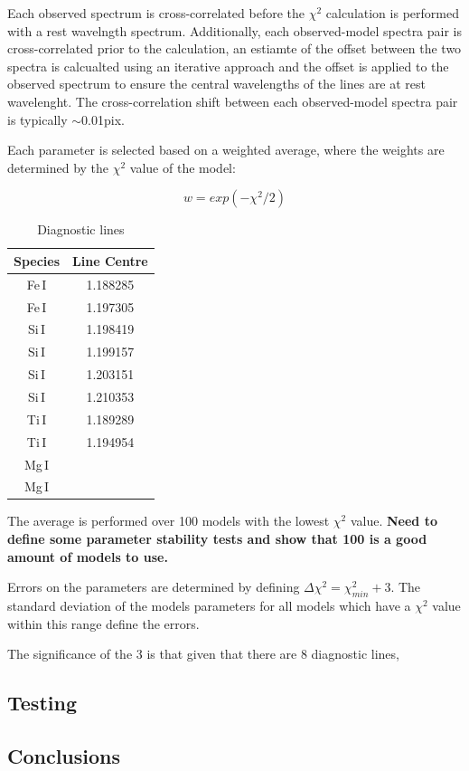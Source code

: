 \documentclass[12pt]{article}
\begin{document}
Each observed spectrum is cross-correlated before the $\chi^{2}$ calculation is performed with a rest wavelngth spectrum.
Additionally, each observed-model spectra pair is cross-correlated prior to the calculation, an estiamte of the offset between the two spectra is calcualted using an iterative approach and the offset is applied to the observed spectrum to ensure the central wavelengths of the lines are at rest wavelenght.
The cross-correlation shift between each observed-model spectra pair is typically $\sim$0.01pix.

Each parameter is selected based on a weighted average, where the weights are
determined by the $\chi^{2}$ value of the model:

\begin{equation}
    w = exp(-\chi^{2}/2)
\end{equation}

\begin{table}
\caption{Diagnostic lines\label{tb:lines}}
\scriptsize
\begin{center}
\begin{tabular}{cc}
 \hline
 \hline
Species & Line Centre \\
 \hline
Fe\,I & 1.188285 \\
Fe\,I & 1.197305 \\
Si\,I & 1.198419 \\
Si\,I & 1.199157 \\
Si\,I & 1.203151 \\
Si\,I & 1.210353 \\
Ti\,I & 1.189289 \\
Ti\,I & 1.194954 \\
Mg\,I & \\
Mg\,I & \\
 \hline
\end{tabular}
\end{center}
\end{table}

The average is performed over 100 models with the lowest $\chi^{2}$ value.
\textbf{Need to define some parameter stability tests and show that 100 is a
good amount of models to use.}

Errors on the parameters are determined by defining
$\Delta\chi^{2} = \chi^{2}_{min} + 3$.
The standard deviation of the models parameters for all models which have a
$\chi^{2}$ value within this range define the errors.

The significance of the 3 is that given that there are 8 diagnostic lines,

\subsection{Testing} %
\label{sub:testing}


\subsection{Conclusions} %
\label{sub:conclusions}

{}

\end{document}
